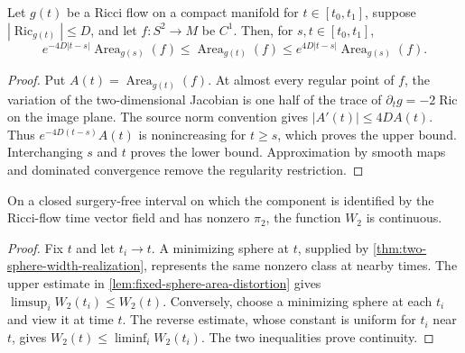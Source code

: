 \begin{lemma}
\label{lem:fixed-sphere-area-distortion}
\notready
Let $g(t)$ be a Ricci flow on a compact manifold for
$t\in[t_0,t_1]$, suppose $|\operatorname{Ric}_{g(t)}|\le D$, and let
$f\colon S^2\to M$ be $C^1$.  Then, for $s,t\in[t_0,t_1]$,
\[
 e^{-4D|t-s|}\operatorname{Area}_{g(s)}(f)
 \le \operatorname{Area}_{g(t)}(f)
 \le e^{4D|t-s|}\operatorname{Area}_{g(s)}(f).
\]
\end{lemma}

\begin{proof}
Put $A(t)=\operatorname{Area}_{g(t)}(f)$.  At almost every regular point of $f$, the
variation of the two-dimensional Jacobian is one half of the trace of
$\partial_tg=-2\operatorname{Ric}$ on the image plane.  The source norm convention gives
$|A'(t)|\le4DA(t)$.  Thus
$e^{-4D(t-s)}A(t)$ is nonincreasing for $t\ge s$, which proves the upper
bound.  Interchanging $s$ and $t$ proves the lower bound.  Approximation by
smooth maps and dominated convergence remove the regularity restriction.
\end{proof}

\begin{lemma}
\label{lem:two-sphere-width-regular-continuity}
\notready
On a closed surgery-free interval on which the component is identified by
the Ricci-flow time vector field and has nonzero $\pi_2$, the function $W_2$
is continuous.
\end{lemma}

\begin{proof}
Fix $t$ and let $t_i\to t$.  A minimizing sphere at $t$, supplied by
\ref{thm:two-sphere-width-realization}, represents the same nonzero class at
nearby times.  The upper estimate in
\ref{lem:fixed-sphere-area-distortion} gives
$\limsup_iW_2(t_i)\le W_2(t)$.  Conversely, choose a minimizing sphere at
each $t_i$ and view it at time $t$.  The reverse estimate, whose constant is
uniform for $t_i$ near $t$, gives
$W_2(t)\le\liminf_iW_2(t_i)$.  The two inequalities prove continuity.
\end{proof}

